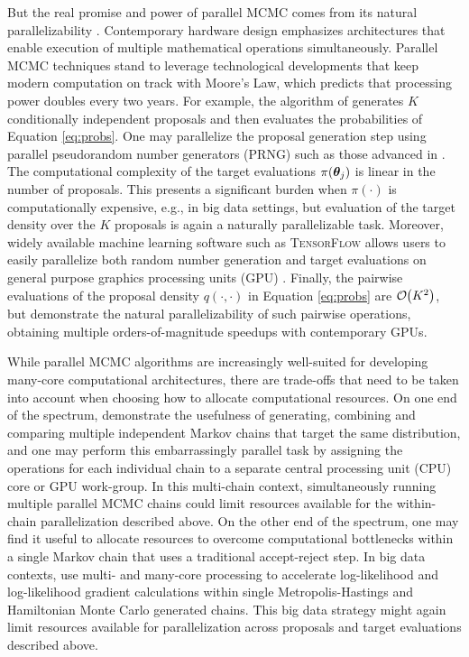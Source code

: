 \documentclass[12pt]{article} %
\newcommand{\order}[1]{{\cal O}\hspace{-0.2em}\left( #1 \right)}
\begin{document}
But the real promise and power of parallel MCMC comes from its natural parallelizability \citep{calderhead2014general}.  Contemporary hardware design emphasizes architectures that enable execution of multiple mathematical operations simultaneously. Parallel MCMC techniques stand to leverage technological developments that keep modern computation on track with Moore's Law, which predicts that processing power doubles every two years.  For example, the algorithm of \citet{tjelmeland2004using} generates $K$ conditionally independent proposals and then evaluates the probabilities of Equation \eqref{eq:probs}.  One may parallelize the proposal generation step using parallel pseudorandom number generators (PRNG) such as those advanced in \citet{salmon2011parallel}. The computational complexity of the target evaluations $\pi(\boldsymbol{\theta}_j)$ is linear in the number of proposals. This presents a significant burden when $\pi(\cdot)$ is computationally expensive, e.g., in big data settings, but evaluation of the target density over the $K$ proposals is again a naturally parallelizable task.  Moreover, widely available machine learning software such as \textsc{TensorFlow} allows users to easily parallelize both random number generation and target evaluations on general purpose graphics processing units (GPU) \citep{lao2020tfp}. Finally, the pairwise evaluations of the proposal density $q(\cdot,\cdot)$ in Equation \eqref{eq:probs} are $\order{K^2}$, but \citet{massive} demonstrate the natural parallelizability of such pairwise operations, obtaining multiple orders-of-magnitude speedups with contemporary GPUs.

While parallel MCMC algorithms are increasingly well-suited for developing many-core computational architectures, there are trade-offs that need to be taken into account when choosing how to allocate computational resources.  On one end of the spectrum, \citet{gelman1992inference} demonstrate the usefulness of generating, combining and comparing multiple independent Markov chains that target the same distribution, and one may perform this embarrassingly parallel task by assigning the operations for each individual chain to a separate central processing unit (CPU) core or GPU work-group.  In this multi-chain context, simultaneously running multiple parallel MCMC chains could limit resources available for the within-chain parallelization described above.  On the other end of the spectrum, one may find it useful to allocate resources to overcome computational bottlenecks within a single Markov chain that uses a traditional accept-reject step. In big data contexts, \citet{holbrook2021viral,massive,holbrook2021scalable} use multi- and many-core processing to accelerate log-likelihood and log-likelihood gradient calculations within single Metropolis-Hastings and Hamiltonian Monte Carlo \citep{neal2011mcmc} generated chains.  This big data strategy might again limit resources available for parallelization across proposals and target evaluations described above.
\end{document}
